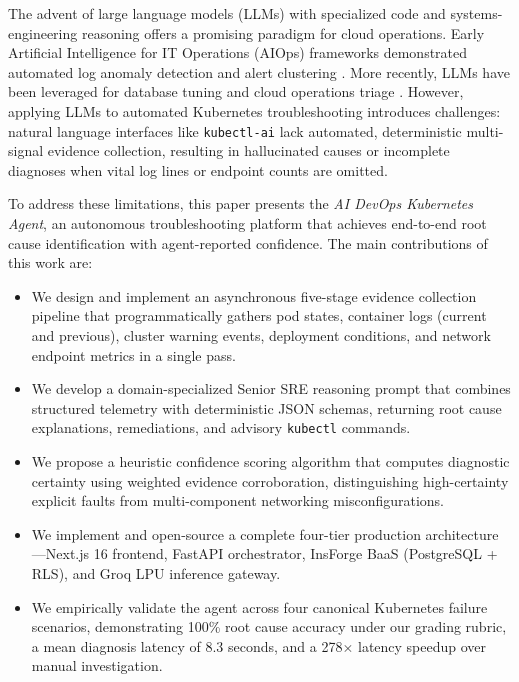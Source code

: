 \documentclass[12pt,onecolumn,draftclsnofoot]{IEEEtran}
\begin{document}
The advent of large language models (LLMs) with specialized code and systems-engineering reasoning offers a promising paradigm for cloud operations. Early Artificial Intelligence for IT Operations (AIOps) frameworks demonstrated automated log anomaly detection and alert clustering \cite{zhang2022aiops,chen2020aiops}. More recently, LLMs have been leveraged for database tuning \cite{fan2023llm4db} and cloud operations triage \cite{deng2023llmops}. However, applying LLMs to automated Kubernetes troubleshooting introduces challenges: natural language interfaces like \texttt{kubectl-ai} \cite{kubectlai2023} lack automated, deterministic multi-signal evidence collection, resulting in hallucinated causes or incomplete diagnoses when vital log lines or endpoint counts are omitted.

To address these limitations, this paper presents the \textit{AI DevOps Kubernetes Agent}, an autonomous troubleshooting platform that achieves end-to-end root cause identification with agent-reported confidence. The main contributions of this work are:
\begin{itemize}
  \item We design and implement an asynchronous five-stage evidence collection pipeline that programmatically gathers pod states, container logs (current and previous), cluster warning events, deployment conditions, and network endpoint metrics in a single pass.
  \item We develop a domain-specialized Senior SRE reasoning prompt that combines structured telemetry with deterministic JSON schemas, returning root cause explanations, remediations, and advisory \texttt{kubectl} commands.
  \item We propose a heuristic confidence scoring algorithm that computes diagnostic certainty using weighted evidence corroboration, distinguishing high-certainty explicit faults from multi-component networking misconfigurations.
  \item We implement and open-source a complete four-tier production architecture—Next.js 16 frontend, FastAPI orchestrator, InsForge BaaS (PostgreSQL + RLS), and Groq LPU inference gateway.
  \item We empirically validate the agent across four canonical Kubernetes failure scenarios, demonstrating 100\% root cause accuracy under our grading rubric, a mean diagnosis latency of 8.3 seconds, and a 278$\times$ latency speedup over manual investigation.
\end{itemize}
\end{document}
